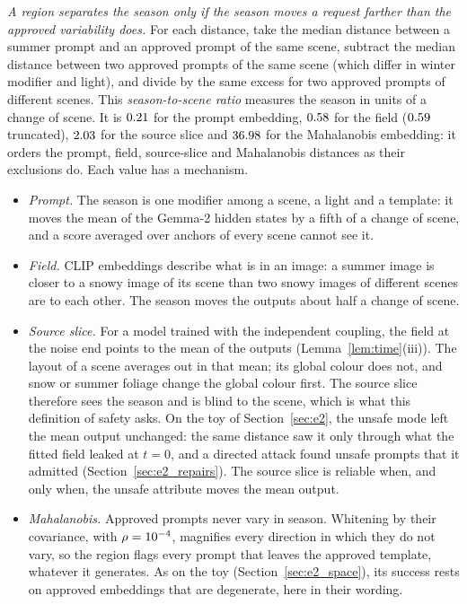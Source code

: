 \documentclass{article}
\theoremstyle{plain}
\theoremstyle{remark}
\begin{document}
\emph{A region separates the season only if the season moves a request farther than the approved variability does.} For each
distance, take the median distance between a summer prompt and an approved prompt of the same scene, subtract the median distance
between two approved prompts of the same scene (which differ in winter modifier and light), and divide by the same excess for two
approved prompts of different scenes. This \emph{season-to-scene ratio} measures the season in units of a change of scene. It is
$0.21$ for the prompt embedding, $0.58$ for the field ($0.59$ truncated), $2.03$ for the source slice and
$36.98$ for the Mahalanobis embedding: it orders the prompt, field, source-slice and Mahalanobis distances as their exclusions
do. Each value has a mechanism.
\begin{itemize}
\item \emph{Prompt.} The season is one modifier among a scene, a light and a template: it moves the mean of the Gemma-2 hidden
states by a fifth of a change of scene, and a score averaged over anchors of every scene cannot see it.
\item \emph{Field.} CLIP embeddings describe what is in an image: a summer image is closer to a snowy image of its scene than two
snowy images of different scenes are to each other. The season moves the outputs about half a change of scene.
\item \emph{Source slice.} For a model trained with the independent coupling, the field at the noise end points to the mean of the
outputs (Lemma~\ref{lem:time}(iii)). The layout of a scene averages out in that mean; its global colour does not, and snow or summer
foliage change the global colour first. The source slice therefore sees the season and is blind to the scene, which is what this
definition of safety asks. On the toy of Section~\ref{sec:e2}, the unsafe mode left the mean output unchanged: the same distance
saw it only through what the fitted field leaked at $t=0$, and a directed attack found unsafe prompts that it admitted
(Section~\ref{sec:e2_repairs}). The source slice is reliable when, and only when, the unsafe attribute moves the mean output.
\item \emph{Mahalanobis.} Approved prompts never vary in season. Whitening by their covariance, with $\rho=10^{-4}$, magnifies every
direction in which they do not vary, so the region flags every prompt that leaves the approved template, whatever it generates. As on
the toy (Section~\ref{sec:e2_space}), its success rests on approved embeddings that are degenerate, here in their wording.
\end{itemize}
\end{document}

